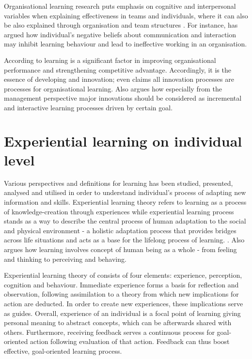 Organisational learning research puts emphasis on cognitive and interpersonal variables when explaining effectiveness in teams and individuals, where it can also be also explained through organisation and team structures \citep{edmondson1999psychological}. For instance, \citet{argyris1993knowledge} has argued how individual's negative beliefs about communication and interaction may inhibit learning behaviour and lead to ineffective working in an organisation. 

According to \citet{march1991exploration} learning is a significant factor in improving organisational performance and strengthening competitive advantage. Accordingly, it is the essence of developing and innovation; \citet{buijs2007innovation} even claims all innovation processes are processes for organisational learning. Also \citep{quinn1985managing} argues how especially from the management perspective major innovations should be considered as incremental and interactive learning processes driven by certain goal.  

\section{Experiential learning on individual level} \label{individual}
Various perspectives and definitions for learning has been studied, presented, analysed and utilised in order to understand individual's process of adapting new information and skills. Experiential learning theory refers to learning as a process of knowledge-creation through experiences while experiential learning process stands as a way to describe the central process of human adaptation to the social and physical environment - a holistic adaptation process that provides bridges across life situations and acts as a base for the lifelong process of learning. \citep{kolb1984experiential}. Also \citet{jung1923psychological} argues how learning involves concept of human being as a whole - from feeling and thinking to perceiving and behaving.

Experiential learning theory of \citet{kolb1984experiential} consists of four elements: experience, perception, cognition and behaviour. Immediate experience forms a basis for reflection and observation, following assimilation to a theory from which new implications for action are deducted. In order to create new experiences, these implications serve as guides. Overall, experience of an individual is a focal point of learning giving personal meaning to abstract concepts, which can be afterwards shared with others. Furthermore, receiving feedback serves a continuous process for goal-oriented action following evaluation of that action. Feedback can thus boost effective, goal-oriented learning process. \citep{kolb1984experiential}

